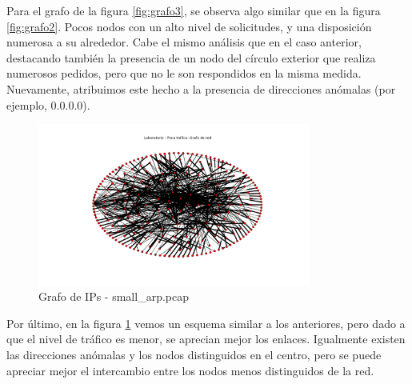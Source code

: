 Para el grafo de la figura \ref{fig:grafo3}, se observa algo similar que en la figura \ref{fig:grafo2}. Pocos nodos con un alto nivel de solicitudes, y una disposición numerosa a su alrededor. Cabe el mismo análisis que en el caso anterior, destacando también la presencia de un nodo del círculo exterior que realiza numerosos pedidos, pero que no le son respondidos en la misma medida. Nuevamente, atribuimos este hecho a la presencia de direcciones anómalas (por ejemplo, $0.0.0.0$).

\begin{figure}[h!]
  \centering
    \includegraphics[width=0.8\textwidth]{graficos/grafoLaboSmall.png}
    \caption{Grafo de IPs - small\_arp.pcap}
    \label{fig:grafo4}
\end{figure}

Por último, en la figura \ref{fig:grafo4} vemos un esquema similar a los anteriores, pero dado a que el nivel de tráfico es menor, se aprecian mejor los enlaces. Igualmente existen las direcciones anómalas y los nodos distinguidos en el centro, pero se puede apreciar mejor el intercambio entre los nodos menos distinguidos de la red.